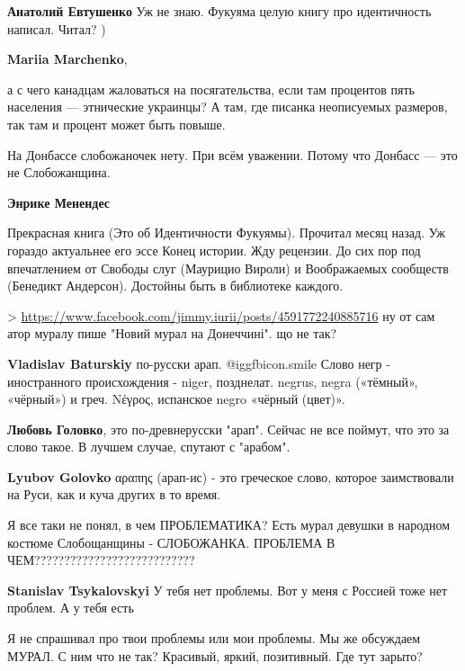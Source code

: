 \begin{itemize}
\begin{itemize}
\textbf{Анатолий Евтушенко} Уж не знаю. Фукуяма целую книгу про идентичность написал. Читал? )

\textbf{Mariia Marchenko}, 

а с чего канадцам жаловаться на посягательства, если там процентов пять
населения — этнические украинцы? А там, где писанка неописуемых размеров, так
там и процент может быть повыше.

На Донбассе слобожаночек нету. При всём уважении. Потому что Донбасс — это не
Слобожанщина.

\textbf{Энрике Менендес} 

Прекрасная книга (Это об Идентичности Фукуямы). Прочитал месяц назад. Уж
гораздо актуальнее его эссе Конец истории. Жду рецензии. До сих пор под
впечатлением от Свободы слуг (Маурицио Вироли) и Воображаемых сообществ
(Бенедикт Андерсон). Достойны быть в библиотеке каждого.

> \url{https://www.facebook.com/jimmy.iurii/posts/4591772240885716}
ну от сам атор муралу пише "Новий мурал на Донеччині". що не так?

\textbf{Vladislav Baturskiy} по-русски арап.  @igg{fbicon.smile}  Слово негр - иностранного происхождения - niger, позднелат. negrus, negra («тёмный», «чёрный») и греч. Νέγρος, испанское negro «чёрный (цвет)».

\textbf{Любовь Головко}, это по-древнерусски "арап". Сейчас не все поймут, что это за слово такое. В лучшем случае, спутают с "арабом".

\textbf{Lyubov Golovko} αραπης (арап-ис) - это греческое слово, которое заимствовали на Руси, как и куча других в то время.
\end{itemize} %


Я все таки не понял, в чем ПРОБЛЕМАТИКА?
Есть мурал девушки в народном костюме Слобощанщины - СЛОБОЖАНКА.
ПРОБЛЕМА В ЧЕМ???????????????????????????

\begin{itemize} %
\textbf{Stanislav Tsykalovskyi} У тебя нет проблемы. Вот у меня с Россией тоже нет проблем. А у тебя есть

Я не спрашивал про твои проблемы или мои проблемы.
Мы же обсуждаем МУРАЛ. С ним что не так? Красивый, яркий, позитивный.
Где тут зарыто?


\end{itemize}
\end{itemize}
